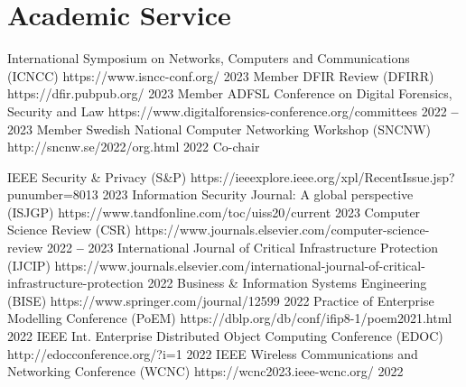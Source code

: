
\section{Academic Service}
    
    
        
        \titleLinkYearRole
            {International Symposium on Networks, Computers and Communications (ICNCC)}
            {https://www.isncc-conf.org/}
            {2023}
            {Member}
        \titleLinkYearRole
            {DFIR Review (DFIRR)}
            {https://dfir.pubpub.org/}
            {2023}
            {Member}
        \titleLinkYearRole
            {ADFSL Conference on Digital Forensics, Security and Law}
            {https://www.digitalforensics-conference.org/committees}
            {2022 \textbf{--} 2023}
            {Member}
        \titleLinkYearRole
            {Swedish National Computer Networking Workshop (SNCNW)}
            {http://sncnw.se/2022/org.html}
            {2022}
            {Co-chair}
    
    \itemizeCVEnd

    
        
        \titleLinkYear
            {IEEE Security \& Privacy (S\&P)}
            {https://ieeexplore.ieee.org/xpl/RecentIssue.jsp?punumber=8013}
            {2023}
        \titleLinkYear
            {Information Security Journal: A global perspective (ISJGP)}
            {https://www.tandfonline.com/toc/uiss20/current}
            {2023}
        \titleLinkYear
            {Computer Science Review (CSR)}
            {https://www.journals.elsevier.com/computer-science-review}
            {2022 \textbf{--} 2023}
        \titleLinkYear
            {International Journal of Critical Infrastructure Protection (IJCIP)}
            {https://www.journals.elsevier.com/international-journal-of-critical-infrastructure-protection}
            {2022}
        \titleLinkYear
            {Business \& Information Systems Engineering (BISE)}
            {https://www.springer.com/journal/12599}
            {2022}
        \titleLinkYear
            {Practice of Enterprise Modelling Conference (PoEM)}
            {https://dblp.org/db/conf/ifip8-1/poem2021.html}
            {2022}
        \titleLinkYear
            {IEEE Int. Enterprise Distributed Object Computing Conference (EDOC)}
            {http://edocconference.org/?i=1}
            {2022}
        \titleLinkYear
            {IEEE Wireless Communications and Networking Conference (WCNC)}
            {https://wcnc2023.ieee-wcnc.org/}
            {2022}
        

